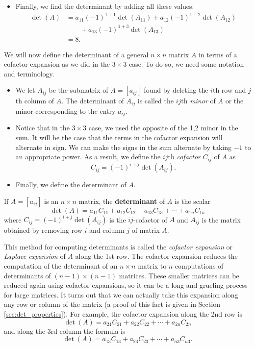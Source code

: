 \begin{itemize}
\item Finally, we find the determinant by adding all these values:
\begin{align*}
 \det(A) &= a_{11} (-1)^{1+1} \det(A_{11}) + a_{12} (-1)^{1+2} \det(A_{12}) \\
	&\qquad + a_{13} (-1)^{1+3} \det(A_{13}) \\
	&= 8.
\end{align*}

\end{itemize}


We will now define the determinant of a general $n \times n$ matrix $A$ in terms of a cofactor expansion as we did in the $3 \times 3$ case. To do so, we need some notation and terminology.

\begin{itemize}
\item We let $A_{ij}$ be the submatrix of $A = [a_{ij}]$ found by deleting the $i$th row and $j$th column of $A$. The determinant of $A_{ij}$ is called the $ij$th \emph{minor} of $A$ or the minor corresponding to the entry $a_{ij}$.
\item Notice that in the $3 \times 3$ case, we used the opposite of the 1,2 minor in the sum. It will be the case that the terms in the cofactor expansion will alternate in sign. We can make the signs in the sum alternate by taking $-1$ to an appropriate power. As a result, we define the $ij$th \emph{cofactor} $C_{ij}$ of $A$ as
\[C_{ij} = (-1)^{i+j} \det\left(A_{ij}\right).\]
\item Finally, we define the determinant of $A$. 
\end{itemize}

\begin{definition} If $A=[a_{ij}]$ is an $n \times n$ matrix, the \textbf{determinant} of $A$ is the scalar 
\[\det(A) = a_{11}C_{11} + a_{12}C_{12} + a_{13}C_{13} + \cdots + a_{1n}C_{1n}\]
where $C_{ij}= (-1)^{i+j} \det(A_{ij})$ is the $ij$-cofactor of $A$ and $A_{ij}$ is the matrix obtained by removing row $i$ and column $j$ of matrix $A$.
\end{definition}


This method for computing determinants is called the \emph{cofactor expansion} or \emph{Laplace expansion} of $A$ along the 1st row. The cofactor expansion reduces the computation of the determinant of an $n \times n$ matrix to $n$ computations of determinants of $(n-1) \times (n-1)$ matrices. These smaller matrices can be reduced again using cofactor expansions, so it can be a long and grueling process for large matrices. It turns out that we can actually take this expansion along any row or column of the matrix (a proof of this fact is given in Section \ref{sec:det_properties}). For example, the cofactor expansion along the 2nd row is  
\[\det(A) = a_{21}C_{21} + a_{22}C_{22} + \cdots + a_{2n}C_{2n}\]
and along the 3rd column the formula is
\[\det(A) = a_{13}C_{13} + a_{23}C_{23} + \cdots + a_{n3}C_{n3}.\]

